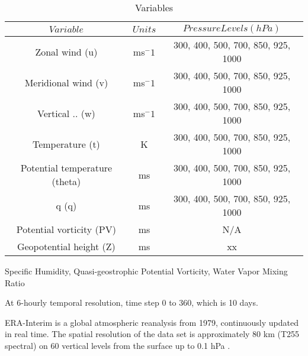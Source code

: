 \begin{table}[h]
	\caption{Variables}\label{t_variables}
	\begin{center}
		\begin{tabular}{ccc}

			\hline\hline
			$Variable$ & $Units$ & $Pressure Levels (hPa)$ \\
			\hline
			Zonal wind (u) & ms$^-1$ & 300, 400, 500, 700, 850, 925, 1000 \\ %
			Meridional wind (v) & ms$^-1$ & 300, 400, 500, 700, 850, 925, 1000  \\
			Vertical .. (w) & ms$^-1$ & 300, 400, 500, 700, 850, 925, 1000  \\
			Temperature (t) & K & 300, 400, 500, 700, 850, 925, 1000 \\
			Potential temperature (theta) & ms & 300, 400, 500, 700, 850, 925, 1000  \\
			q (q) & ms & 300, 400, 500, 700, 850, 925, 1000  \\
			Potential vorticity (PV) & ms & N/A  \\
			Geopotential height (Z) & ms & xx  \\

			\hline
		\end{tabular}
	\end{center}
\end{table}
Specific Humidity, Quasi-geostrophic Potential Vorticity, Water Vapor Mixing Ratio

At 6-hourly temporal resolution, time step 0 to 360, which is 10 days.

ERA-Interim is a global atmospheric reanalysis from 1979, continuously updated in real time. The spatial resolution of the data set is approximately 80 km (T255 spectral) on 60 vertical levels from the surface up to 0.1 hPa \citep{dee2011era}.

